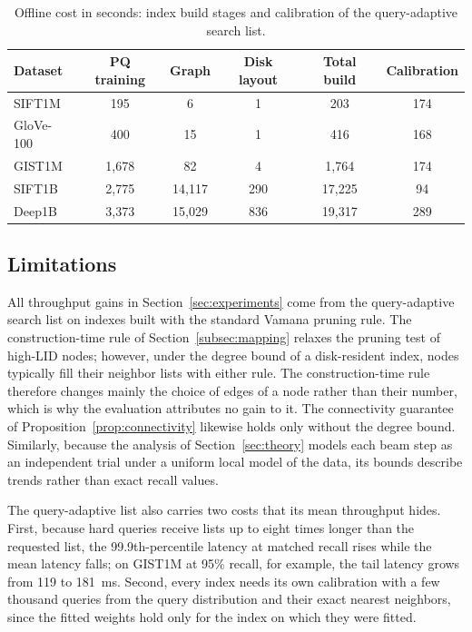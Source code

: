 \documentclass{article}
\theoremstyle{plain}
\theoremstyle{definition}
\theoremstyle{remark}
\begin{document}
\begin{table}[t]
\centering
\small
\caption{Offline cost in seconds: index build stages and calibration of the query-adaptive search list.}
\label{tab:offline_cost}
\begin{tabular}{lccccc}
\toprule
Dataset & PQ training & Graph & Disk layout & Total build & Calibration \\
\midrule
SIFT1M    & 195   & 6       & 1   & 203       & 174 \\
GloVe-100 & 400   & 15      & 1   & 416       & 168 \\
GIST1M    & 1{,}678 & 82    & 4   & 1{,}764   & 174 \\
SIFT1B    & 2{,}775 & 14{,}117 & 290 & 17{,}225 & 94  \\
Deep1B    & 3{,}373 & 15{,}029 & 836 & 19{,}317 & 289 \\
\bottomrule
\end{tabular}
\end{table}

\subsection{Limitations}
\label{appendix:limitations}

All throughput gains in Section~\ref{sec:experiments} come from the query-adaptive search list on indexes built with the standard Vamana pruning rule. The construction-time rule of Section~\ref{subsec:mapping} relaxes the pruning test of high-LID nodes; however, under the degree bound of a disk-resident index, nodes typically fill their neighbor lists with either rule. The construction-time rule therefore changes mainly the choice of edges of a node rather than their number, which is why the evaluation attributes no gain to it. The connectivity guarantee of Proposition~\ref{prop:connectivity} likewise holds only without the degree bound. Similarly, because the analysis of Section~\ref{sec:theory} models each beam step as an independent trial under a uniform local model of the data, its bounds describe trends rather than exact recall values.

The query-adaptive list also carries two costs that its mean throughput hides. First, because hard queries receive lists up to eight times longer than the requested list, the 99.9th-percentile latency at matched recall rises while the mean latency falls; on GIST1M at 95\% recall, for example, the tail latency grows from 119 to 181~ms. Second, every index needs its own calibration with a few thousand queries from the query distribution and their exact nearest neighbors, since the fitted weights hold only for the index on which they were fitted.
\end{document}
